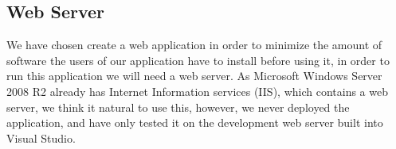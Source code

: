 \subsection{Web Server}
\label{subsec:webserver}


We have chosen create a web application in order to minimize the amount of software the users of our application have to install before using it, in order to run this application we will need a web server. As Microsoft Windows Server 2008 R2 already has Internet Information services (IIS), which contains a web server, we think it natural to use this, however, we never deployed the application, and have only tested it on the development web server built into Visual Studio.



